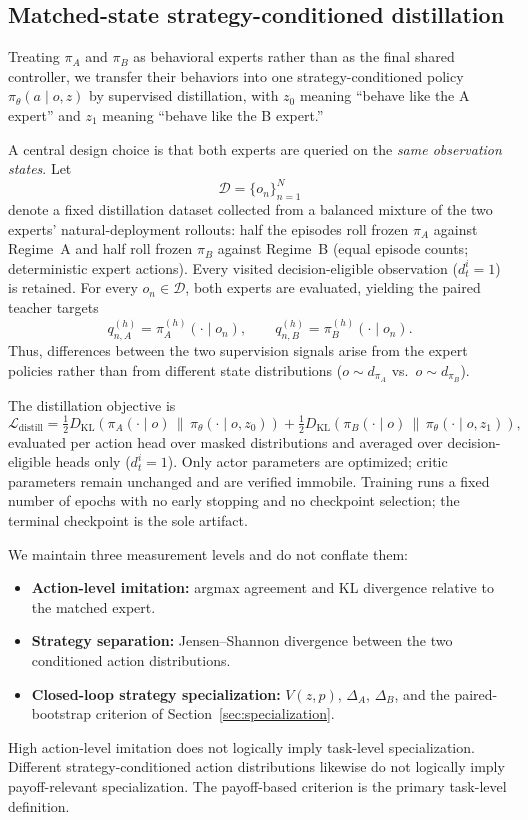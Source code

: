 \documentclass{article}
\begin{document}
\subsection{Matched-state strategy-conditioned distillation}
\label{sec:distill}

Treating $\pi_A$ and $\pi_B$ as behavioral experts rather than as the final
shared controller, we transfer their behaviors into one strategy-conditioned
policy $\pi_\theta(a\mid o,z)$ by supervised distillation, with
$z_0$ meaning ``behave like the A expert'' and $z_1$ meaning ``behave like the
B expert.''

A central design choice is that both experts are queried on the
\emph{same observation states}. Let
\[
\mathcal{D}
=
\{o_n\}_{n=1}^{N}
\]
denote a fixed distillation dataset collected from a balanced mixture of the
two experts' natural-deployment rollouts: half the episodes roll frozen
$\pi_A$ against Regime~A and half roll frozen $\pi_B$ against Regime~B
(equal episode counts; deterministic expert actions). Every visited
decision-eligible observation ($d_t^i=1$) is retained.
For every $o_n\in\mathcal{D}$, both experts are evaluated,
yielding the paired teacher targets
\[
q_{n,A}^{(h)}
=
\pi_A^{(h)}(\cdot\mid o_n),
\qquad
q_{n,B}^{(h)}
=
\pi_B^{(h)}(\cdot\mid o_n).
\]
Thus, differences between the two supervision signals arise from the expert
policies rather than from different state distributions
($o\!\sim\!d_{\pi_A}$ vs.\ $o\!\sim\!d_{\pi_B}$).

The distillation objective is
\[
\mathcal{L}_{\mathrm{distill}}
=
\tfrac{1}{2}D_{\mathrm{KL}}\!\left(\pi_A(\cdot\mid o)\,\|\,\pi_\theta(\cdot\mid o,z_0)\right)
+
\tfrac{1}{2}D_{\mathrm{KL}}\!\left(\pi_B(\cdot\mid o)\,\|\,\pi_\theta(\cdot\mid o,z_1)\right),
\]
evaluated per action head over masked distributions and averaged over
decision-eligible heads only ($d_t^i=1$). Only actor parameters are optimized;
critic parameters remain unchanged and are verified immobile. Training runs a
fixed number of epochs with no early stopping and no checkpoint selection; the
terminal checkpoint is the sole artifact.

We maintain three measurement levels and do not conflate them:
\begin{itemize}
  \item \textbf{Action-level imitation:} argmax agreement and KL divergence
  relative to the matched expert.
  \item \textbf{Strategy separation:} Jensen--Shannon divergence between the
  two conditioned action distributions.
  \item \textbf{Closed-loop strategy specialization:} $V(z,p)$, $\Delta_A$,
  $\Delta_B$, and the paired-bootstrap criterion of
  Section~\ref{sec:specialization}.
\end{itemize}
High action-level imitation does not logically imply task-level specialization.
Different strategy-conditioned action distributions likewise do not logically
imply payoff-relevant specialization. The payoff-based criterion is the primary
task-level definition.
\end{document}
